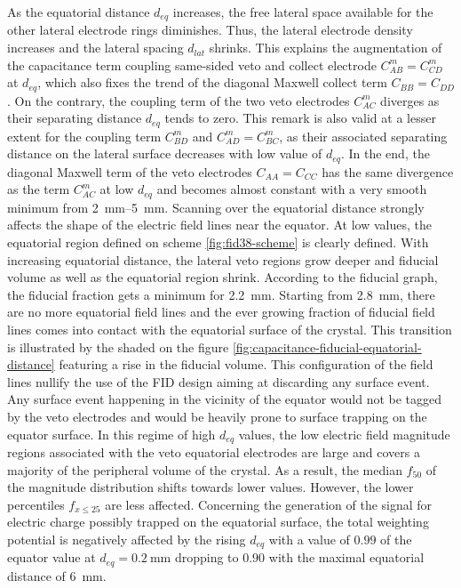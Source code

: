 As the equatorial distance $d_{eq}$ increases, the free lateral space available for the other lateral electrode rings diminishes. Thus, the lateral electrode density increases and the lateral spacing $d_{lat}$ shrinks. 
This explains the augmentation of the capacitance term coupling same-sided veto and collect electrode $C_{AB}^m=C_{CD}^m$ at $d_{eq}$, which also fixes the trend of the diagonal Maxwell collect term $C_{BB}=C_{DD}$. On the contrary, the coupling term of the two veto electrodes $C_{AC}^m$ diverges as their separating distance $d_{eq}$ tends to zero. This remark is also valid at a lesser extent for the coupling term $C_{BD}^m$ and $C_{AD}^m = C_{BC}^m$,  as their associated separating distance on the lateral surface decreases with low value of $d_{eq}$. In the end, the diagonal Maxwell term of the veto electrodes $C_{AA} = C_{CC}$ has the same divergence as the term $C_{AC}^m$ at low $d_{eq}$ and becomes almost constant with a very smooth minimum from \SIrange{2}{5}{\mm}.
Scanning over the equatorial distance strongly affects the shape of the electric field lines near the equator. At low values, the equatorial region defined on scheme \ref{fig:fid38-scheme} is clearly defined. With increasing equatorial distance, the lateral veto regions grow deeper and fiducial volume as well as the equatorial region shrink. According to the fiducial graph, the fiducial fraction gets a minimum for \SI{2.2}{\mm}. Starting from \SI{2.8}{\mm}, there are no more equatorial field lines and the ever growing fraction of fiducial field lines comes into contact with the equatorial surface of the crystal. This transition is illustrated by the shaded on the figure \ref{fig:capacitance-fiducial-equatorial-distance} featuring a rise in the fiducial volume. This configuration of the field lines nullify the use of the FID design aiming at discarding any surface event. Any surface event happening in the vicinity of the equator would not be tagged by the veto electrodes and would be heavily prone to surface trapping on the equator surface.
In this regime of high $d_{eq}$ values, the low electric field magnitude regions associated with the veto equatorial electrodes are large and covers a majority of the peripheral volume of the crystal. As a result, the median $f_{50}$ of the magnitude distribution shifts towards lower values. However, the lower percentiles $f_{x \leq 25}$ are less affected.
Concerning the generation of the signal for electric charge possibly trapped on the equatorial surface, the total weighting potential is negatively affected by the rising $d_{eq}$ with a value of $0.99$ of the equator value at $d_{eq}=\SI{0.2}{\mm}$ dropping to $0.90$ with the maximal equatorial distance of \SI{6}{\mm}.

